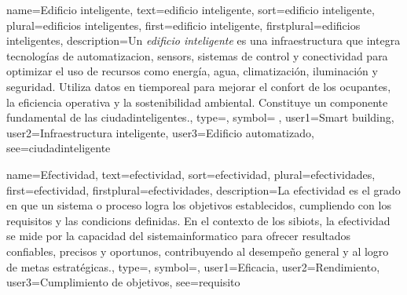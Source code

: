 	
	{
		name={Edificio inteligente},
		text={edificio inteligente},
		sort={edificio inteligente},
		plural={edificios inteligentes},
		first={edificio inteligente},
		firstplural={edificios inteligentes},
		description={Un \emph{edificio inteligente} es una infraestructura que integra tecnolog{\'i}as de \gls{automatizacion}, \glspl{sensor}, sistemas de control y \gls{conectividad} para optimizar el uso de recursos como energ{\'i}a, agua, climatizaci{\'o}n, iluminaci{\'o}n y \gls{seguridad}. Utiliza \glspl{dato} en \gls{tiemporeal} para mejorar el confort de los ocupantes, la eficiencia operativa y la sostenibilidad ambiental. Constituye un componente fundamental de las \glspl{ciudadinteligente}.},
		type=\glsdefaulttype,
		symbol={🏢},
		user1={Smart building},
		user2={Infraestructura inteligente},
		user3={Edificio automatizado},
		see={ciudadinteligente}
	}
	
	
	{
		name={Efectividad},
		text={efectividad},
		sort={efectividad},
		plural={efectividades},
		first={efectividad},
		firstplural={efectividades},
		description={La efectividad es el grado en que un \gls{sistema} o \gls{proceso} logra los objetivos establecidos, cumpliendo con los \glspl{requisito} y las \glspl{condicion} definidas. En el contexto de los \glspl{sibiot}, la efectividad se mide por la capacidad del \gls{sistemainformatico} para ofrecer resultados confiables, precisos y oportunos, contribuyendo al desempe{\~n}o general y al logro de metas estrat{\'e}gicas.},
		type=\glsdefaulttype,
		symbol={},
		user1={Eficacia},
		user2={Rendimiento},
		user3={Cumplimiento de objetivos},
		see={requisito}
	}
	
